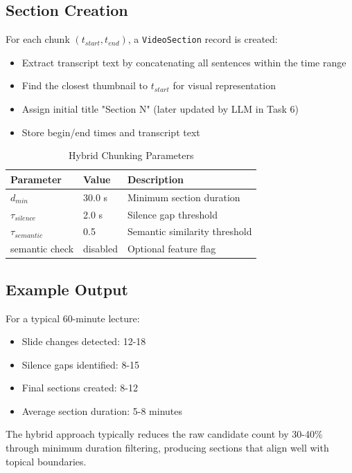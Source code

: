 \subsection{Section Creation}

For each chunk $(t_{start}, t_{end})$, a \texttt{VideoSection} record is created:

\begin{itemize}
    \item Extract transcript text by concatenating all sentences within the time range
    \item Find the closest thumbnail to $t_{start}$ for visual representation
    \item Assign initial title "Section N" (later updated by LLM in Task 6)
    \item Store begin/end times and transcript text
\end{itemize}

\begin{table}[H]
    \centering
    \caption{Hybrid Chunking Parameters}
    \begin{tabular}{@{}lll@{}}
        \toprule
        \textbf{Parameter} & \textbf{Value} & \textbf{Description} \\ \midrule
        $d_{min}$ & 30.0 s & Minimum section duration \\
        $\tau_{silence}$ & 2.0 s & Silence gap threshold \\
        $\tau_{semantic}$ & 0.5 & Semantic similarity threshold \\
        semantic check & disabled & Optional feature flag \\ \bottomrule
    \end{tabular}
\end{table}

\subsection{Example Output}

For a typical 60-minute lecture:

\begin{itemize}
    \item Slide changes detected: 12-18
    \item Silence gaps identified: 8-15
    \item Final sections created: 8-12
    \item Average section duration: 5-8 minutes
\end{itemize}

The hybrid approach typically reduces the raw candidate count by 30-40\% through minimum duration filtering, producing sections that align well with topical boundaries.
